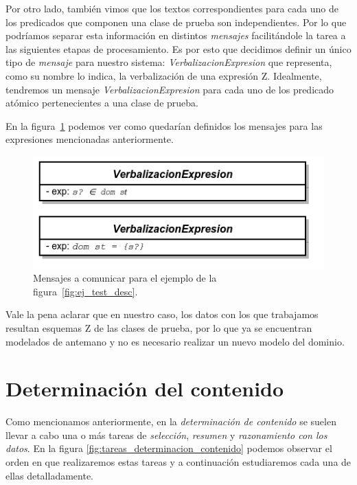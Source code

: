 \bigskip
Por otro lado, también vimos que los textos correspondientes para cada uno de los predicados que componen una clase de prueba son independientes. Por lo que podríamos separar esta información en distintos \emph{mensajes} facilitándole la tarea a las siguientes etapas de procesamiento. Es por esto que decidimos definir un único tipo de \emph{mensaje} para nuestro sistema: \emph{VerbalizacionExpresion} que representa, como su nombre lo indica, la verbalización de una expresión Z. Idealmente, tendremos un mensaje \emph{VerbalizacionExpresion} para cada uno de los predicado atómico pertenecientes a una clase de prueba.

En la figura~\ref{fig:ej_mensajes} podemos ver como quedarían definidos los mensajes para las expresiones mencionadas anteriormente.

\begin{figure}[H]
  	\centering
	\includegraphics[scale=0.4]{img/mensajes.png}
	\caption{Mensajes a comunicar para el ejemplo de la figura~\ref{fig:ej_test_desc}.}
  	\label{fig:ej_mensajes}
\end{figure}

Vale la pena aclarar que en nuestro caso, los datos con los que trabajamos resultan esquemas Z de las clases de prueba, por lo que ya se encuentran modelados de antemano y no es necesario realizar un nuevo modelo del dominio.
 

\section{Determinación del contenido}
\label{cap:determinacion_contenido}

Como mencionamos anteriormente, en la \emph{determinación de contenido} se suelen llevar a cabo una o más tareas de \emph{selección}, \emph{resumen} y \emph{razonamiento con los datos}. En la figura \ref{fig:tareas_determinacion_contenido} podemos observar el orden en que realizaremos estas tareas y a continuación estudiaremos cada una de ellas detalladamente.

